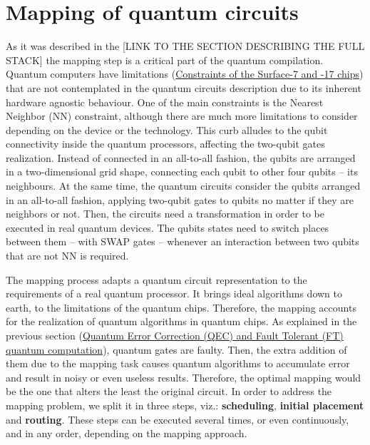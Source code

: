 \section*{Mapping of quantum circuits}
\label{sec:org33a759f}
As it was described in the [LINK TO THE SECTION DESCRIBING THE FULL STACK] the mapping step is a critical part of the quantum compilation.
Quantum computers have limitations (\href{chapter-3.org}{Constraints of the Surface-7 and -17 chips}) that are not contemplated in the quantum circuits description due to its inherent hardware agnostic behaviour.
One of the main constraints is the Nearest Neighbor (NN) constraint, although there are much more limitations to consider depending on the device or the technology.
This curb alludes to the qubit connectivity inside the quantum processors, affecting the two-qubit gates realization.
Instead of connected in an all-to-all fashion, the qubits are arranged in a two-dimensional grid shape, connecting each qubit to other four qubits -- its neighbours.
At the same time, the quantum circuits consider the qubits arranged in an all-to-all fashion, applying two-qubit gates to qubits no matter if they are neighbors or not.
Then, the circuits need a transformation in order to be executed in real quantum devices.
The qubits states need to switch places between them -- with SWAP gates -- whenever an interaction between two qubits that are not NN is required. 

The mapping process adapts a quantum circuit representation to the requirements of a real quantum processor.
It brings ideal algorithms down to earth, to the limitations of the quantum chips.
Therefore, the mapping accounts for the realization of quantum algorithms in quantum chips.
As explained in the previous section (\hyperref[sec:org873115d]{Quantum Error Correction (QEC) and Fault Tolerant (FT) quantum computation}), quantum gates are faulty.
Then, the extra addition of them due to the mapping task causes quantum algorithms to accumulate error and result in noisy or even useless results.
Therefore, the optimal mapping would be the one that alters the least the original circuit.
In order to address the mapping problem, we split it in three steps, viz.: \textbf{scheduling}, \textbf{initial placement} and \textbf{routing}.
These steps can be executed several times, or even continuously, and in any order, depending on the mapping approach.


